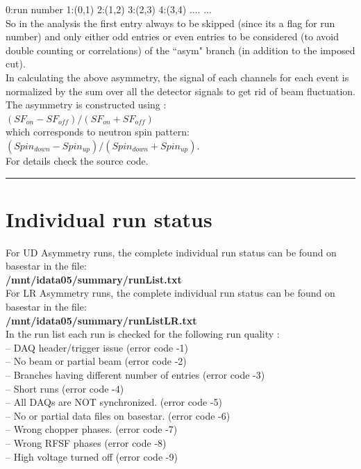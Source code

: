 \documentclass[12pt]{article}
\begin{document}
0:run number 1:(0,1) 2:(1,2) 3:(2,3) 4:(3,4) .... ... \\

So in the analysis the first entry always to be skipped (since its a flag for run number) and only either odd entries or even entries to be considered (to avoid double counting or correlations) of the ``asym" branch (in addition to the imposed cut). \\

In calculating the above asymmetry, the signal of each channels for each event is normalized by the sum over all the detector signals to get rid of beam fluctuation. \\
The asymmetry is constructed using : \\
$(SF_{on} - SF_{off})/(SF_{on} + SF_{off})$ \\
which corresponds to neutron spin pattern: \\
 $(Spin_{down} - Spin_{up})/(Spin_{down} + Spin_{up})$. \\


For details check the source code.

\noindent
{\color{red} \rule{\linewidth}{1mm} }

\newpage
\section{Individual run status}

For UD Asymmetry runs, the complete individual run status can be found on basestar in the file: \\
\textbf{/mnt/idata05/summary/runList.txt } \\

For LR Asymmetry runs, the complete individual run status can be found on basestar in the file: \\
\textbf{/mnt/idata05/summary/runListLR.txt } \\

In the run list each run is checked for the following run quality :\\
-- DAQ header/trigger issue (error code -1)\\
-- No beam or partial beam (error code -2)\\
-- Branches having different number of entries (error code -3) \\
-- Short runs (error code -4)\\
-- All DAQs are NOT synchronized. (error code -5)\\
-- No or partial data files on basestar. (error code -6)\\
-- Wrong chopper phases. (error code -7)\\
-- Wrong RFSF phases (error code -8)\\
-- High voltage turned off (error code -9)\\
\end{document}
